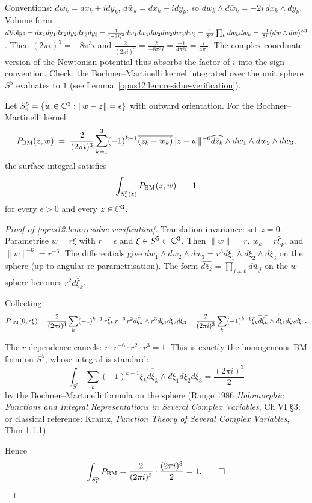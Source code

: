 \begin{remark}\ClaimStatusRemark
\label{opus12:rem:normalisation}
Conventions: $dw_k = dx_k + i dy_k$, $d\bar w_k = dx_k - i dy_k$, so
$dw_k \wedge d\bar w_k = -2i \, dx_k \wedge dy_k$. Volume form
$d\mathrm{Vol}_{\mathbb{R}^6} = dx_1 dy_1 dx_2 dy_2 dx_3 dy_3 = \frac{1}{(-2i)^3}
dw_1 d\bar w_1 dw_2 d\bar w_2 dw_3 d\bar w_3 = \frac{1}{8i^3}
\prod_k dw_k d\bar w_k = \frac{-1}{8 i} (dw \wedge d\bar w)^{\wedge 3}$.
Then $(2\pi i)^3 = -8\pi^3 i$ and
$\frac{2}{(2\pi i)^3} = \frac{2}{-8\pi^3 i} = \frac{-1}{4\pi^3 i} =
\frac{i}{4\pi^3}$. The complex-coordinate version of the Newtonian
potential thus absorbs the factor of $i$ into the sign convention.
Check: the Bochner--Martinelli kernel integrated over the unit sphere
$S^5$ evaluates to $1$ (see
Lemma~\ref{opus12:lem:residue-verification}).
\end{remark}

\begin{lemma}\ClaimStatusLemma
\label{opus12:lem:residue-verification}
Let $S^5_\epsilon = \{w \in \mathbb{C}^3 : \|w - z\| = \epsilon\}$ with
outward orientation. For the Bochner--Martinelli kernel
\[
P_{\mathrm{BM}}(z, w) \;=\; \frac{2}{(2\pi i)^3} \sum_{k=1}^{3} (-1)^{k-1}
\overline{(z_k - w_k)} \|z - w\|^{-6}
\widehat{d\bar z_k} \wedge dw_1 \wedge dw_2 \wedge dw_3,
\]
the surface integral satisfies
\[
\int_{S^5_\epsilon(z)} P_{\mathrm{BM}}(z, w) \;=\; 1
\]
for every $\epsilon > 0$ and every $z \in \mathbb{C}^3$.
\end{lemma}

\begin{proof}[Proof of \ref{opus12:lem:residue-verification}]
Translation invariance: set $z = 0$. Parametrise
$w = r \xi$ with $r = \epsilon$ and $\xi \in S^5 \subset \mathbb{C}^3$.
Then $\|w\| = r$, $\bar w_k = r \bar\xi_k$, and
$\|w\|^{-6} = r^{-6}$. The differentials give
$dw_1 \wedge dw_2 \wedge dw_3 = r^3 d\xi_1 \wedge d\xi_2 \wedge d\xi_3$
on the sphere (up to angular re-parametrisation). The form
$\widehat{d\bar z_k} = \prod_{j \ne k} d\bar w_j$ on the $w$-sphere
becomes $r^2 d\hat{\bar\xi}_k$.

Collecting:
\[
P_{\mathrm{BM}}(0, r\xi) = \frac{2}{(2\pi i)^3} \sum_k (-1)^{k-1}
\, r \bar\xi_k\, r^{-6}\, r^2 d\hat{\bar\xi}_k \wedge r^3
d\xi_1 d\xi_2 d\xi_3 = \frac{2}{(2\pi i)^3} \sum_k (-1)^{k-1}
\bar\xi_k \widehat{d\bar\xi_k} \wedge d\xi_1 d\xi_2 d\xi_3.
\]

The $r$-dependence cancels: $r \cdot r^{-6} \cdot r^2 \cdot r^3 = 1$.
This is exactly the homogeneous BM form on $S^5$, whose integral is
standard:
\[
\int_{S^5} \sum_k (-1)^{k-1} \bar\xi_k \widehat{d\bar\xi_k} \wedge
d\xi_1 d\xi_2 d\xi_3 = \frac{(2\pi i)^3}{2}
\]
by the Bochner--Martinelli formula on the sphere (Range 1986
\textit{Holomorphic Functions and Integral Representations in Several
Complex Variables}, Ch VI §3; or classical reference: Krantz,
\textit{Function Theory of Several Complex Variables}, Thm 1.1.1).

Hence
\[
\int_{S^5_\epsilon} P_{\mathrm{BM}} = \frac{2}{(2\pi i)^3} \cdot
\frac{(2\pi i)^3}{2} = 1. \qed
\]
\end{proof}


